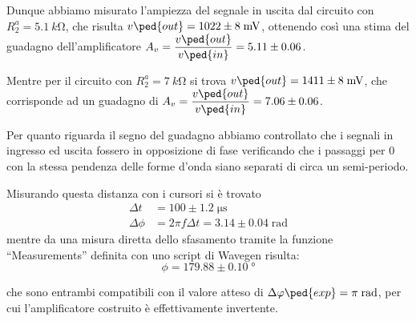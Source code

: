 \documentclass[10pt,a4paper]{article}
\begin{document}
Dunque abbiamo misurato l'ampiezza del segnale in uscita dal circuito con
$R_2^a = \SI{5.1}{k\ohm}$, che risulta $v\ped{out} = 1022 \pm 8 \; \si{m\V}$,
ottenendo così una stima del guadagno dell'amplificatore
$A_v = \dfrac{v\ped{out}}{v\ped{in}} = 5.11 \pm 0.06 $.

Mentre per il circuito con $R_2^a = \SI{7}{k\ohm}$ si trova
$v\ped{out} = 1411 \pm 8 \; \si{m\V}$, che corrisponde ad un guadagno di
$A_v = \dfrac{v\ped{out}}{v\ped{in}} = 7.06 \pm 0.06$.

Per quanto riguarda il segno del guadagno abbiamo controllato che i segnali in
ingresso ed uscita fossero in opposizione di fase verificando che i passaggi
per 0 con la stessa pendenza delle forme d'onda siano separati di circa un
semi-periodo.

Misurando questa distanza con i cursori si è trovato
\begin{align*}
\Delta t &= 100 \pm 1.2 \; \si{\micro\s}\\
\Delta \phi &= 2\pi f \Delta t = 3.14 \pm 0.04 \; \si{\radian}
\end{align*}
mentre da una misura diretta dello sfasamento tramite la funzione
``Measurements'' definita con uno script di Wavegen risulta:
\[
\phi = 179.88 \pm 0.10 \; \si{\degree}
\]

che sono entrambi compatibili con il valore atteso di $\Delta \phi\ped{exp}
= \pi \; \si{\radian}$, per cui l'amplificatore costruito è effettivamente
invertente.
\end{document}
